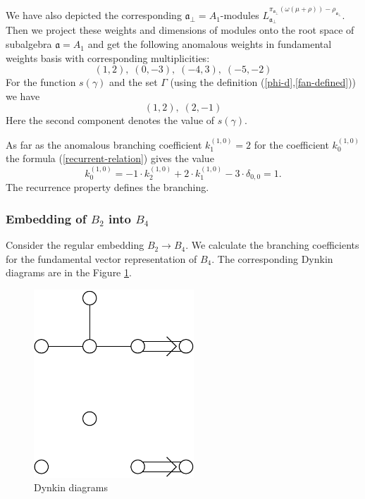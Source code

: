 \documentclass[a4paper,12pt]{article}
\theoremstyle{definition} \newtheorem{Def}{Definition}
\begin{document}
We have also depicted the corresponding $\mathfrak{a}_{\bot}=A_1$-modules $L^{\pi_{\mathfrak{a}_{\bot}}(\omega(\mu+\rho))-\rho_{\mathfrak{a}_{\bot}}}_{\mathfrak{a}_{\bot}}$.
Then we project these weights and dimensions of modules onto the root space of subalgebra $\mathfrak{a}=A_1$ and get the following anomalous weights in fundamental weights basis with corresponding multiplicities:
\begin{equation}
  \label{eq:25}
  (1,2),\; (0,-3),\; (-4,3),\; (-5,-2)
\end{equation}
For the function $s(\gamma)$ and the set $\Gamma$ (using the definition (\ref{phi-d},\ref{fan-defined})) we have
\begin{equation}
  \label{eq:22}
  (1,2),\; (2,-1)
\end{equation}
Here the second component denotes the value of $s(\gamma)$.

As far as the anomalous branching coefficient $k^{(1,0)}_{1}=2$ for the coefficient $k^{(1,0)}_{0}$ the formula (\ref{recurrent-relation}) gives the value
\begin{equation}
  \label{eq:23}
  k^{(1,0)}_{0}=-1\cdot k^{(1,0)}_2 +2\cdot k^{(1,0)}_1 - 3\cdot \delta_{0,0} = 1.
\end{equation}
The recurrence property defines the branching.

\subsubsection{Embedding of $B_2$ into $B_4$}
\label{sec:someth-high-dimens}
Consider the regular embedding $B_2 \longrightarrow B_4$.
We calculate the branching coefficients for the fundamental vector representation of $B_4$.
The corresponding Dynkin diagrams are in the Figure \ref{fig:dynkin}.
\begin{figure}[ph]
  \centering
  \includegraphics[width=60mm]{B4_B2_2A1.pdf}
  \caption{Dynkin diagrams}
  \label{fig:dynkin}
\end{figure}
\end{document}
